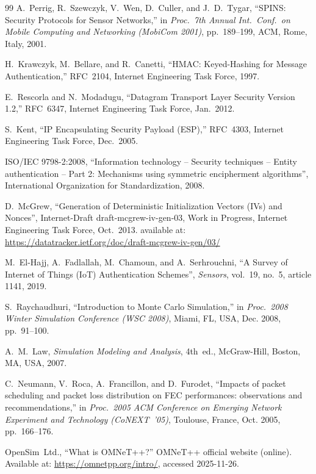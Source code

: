 \documentclass[twocolumn,10pt,a4paper]{jsarticle}
\begin{document}
\begin{thebibliography}{99}
A.~Perrig, R.~Szewczyk, V.~Wen, D.~Culler, and J.~D.~Tygar,
``SPINS: Security Protocols for Sensor Networks,''
in \textit{Proc.\ 7th Annual Int.\ Conf.\ on Mobile Computing and Networking (MobiCom 2001)},
pp.~189--199, ACM, Rome, Italy, 2001.

H.~Krawczyk, M.~Bellare, and R.~Canetti,
``HMAC: Keyed-Hashing for Message Authentication,''
RFC~2104, Internet Engineering Task Force, 1997.

E.~Rescorla and N.~Modadugu,
``Datagram Transport Layer Security Version 1.2,''
RFC~6347, Internet Engineering Task Force, Jan.\ 2012.

S.~Kent,
``IP Encapsulating Security Payload (ESP),''
RFC~4303, Internet Engineering Task Force, Dec.\ 2005.

ISO/IEC 9798-2:2008,
``Information technology -- Security techniques -- Entity authentication -- Part 2: Mechanisms using symmetric encipherment algorithms'',
International Organization for Standardization, 2008.

D.~McGrew,
``Generation of Deterministic Initialization Vectors (IVs) and Nonces'',
Internet-Draft draft-mcgrew-iv-gen-03, Work in Progress,
Internet Engineering Task Force, Oct.\ 2013.
available at: \url{https://datatracker.ietf.org/doc/draft-mcgrew-iv-gen/03/}

M.~El-Hajj, A.~Fadlallah, M.~Chamoun, and A.~Serhrouchni,
``A Survey of Internet of Things (IoT) Authentication Schemes'',
\textit{Sensors}, vol.~19, no.~5, article 1141, 2019.

S.~Raychaudhuri,
``Introduction to Monte Carlo Simulation,''
in \textit{Proc.\ 2008 Winter Simulation Conference (WSC 2008)},
Miami, FL, USA, Dec. 2008, pp.~91--100.

A.~M.~Law,
\textit{Simulation Modeling and Analysis}, 4th~ed.,
McGraw-Hill, Boston, MA, USA, 2007.

C.~Neumann, V.~Roca, A.~Francillon, and D.~Furodet,
``Impacts of packet scheduling and packet loss distribution on FEC performances: observations and recommendations,''
in \textit{Proc.\ 2005 ACM Conference on Emerging Network Experiment and Technology (CoNEXT~'05)},
Toulouse, France, Oct. 2005, pp.~166--176.

OpenSim~Ltd.,
``What is OMNeT++?''
OMNeT++ official website (online).
Available at: \url{https://omnetpp.org/intro/},
accessed 2025-11-26.


\end{thebibliography}
\end{document}

